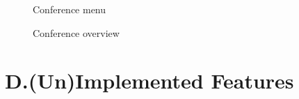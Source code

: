 \documentclass[nochapterpage,nopartpage,noheadingspace,numbersubsubsec,bigchapter,colorback,accentcolor=tud9c,10pt]{tudreport}
\begin{document}
        \begin{figure}
            \centering
            \caption{Conference menu}
            \label{fig:conference-menu}
        \end{figure}

        \begin{figure}
            \centering
            \caption{Conference overview}
            \label{fig:conference-overview}
        \end{figure}

  \chapter*{D.\quad (Un)Implemented Features}
\end{document}
